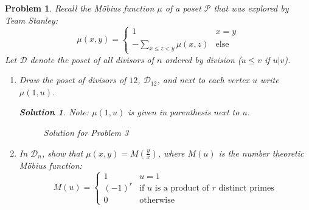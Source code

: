 \documentclass{article}
\theoremstyle{normal}
\newtheorem{problem}{Problem}
\theoremstyle{thmit}
\newtheorem*{solution}{Solution}
\begin{document}
\begin{problem}
    Recall the M\"{o}bius function $\mu$ of a poset $\mathcal{P}$ that was explored by Team Stanley:
    \begin{equation}
        \mu(x,y)=
        \begin{cases}
            1&x=y\\
            -\sum_{x\leq z < y}\mu(x,z)&\text{else}
        \end{cases}
    \end{equation}
    Let $\mathcal{D}$ denote the poset of all divisors of $n$ ordered by division ($u\leq v$ if $u|v$).
    \begin{enumerate}
        \item[(a)]
            Draw the poset of divisors of $12$, $\mathcal{D}_{12}$,
            and next to each vertex $u$ write $\mu(1,u)$.
            \begin{solution}
                Note: $\mu(1,u)$ is given in parenthesis next to $u$.
                \begin{figure}[H]
                    \centering
                    \caption{Solution for Problem 3}
                    \label{fig:SolutionProblem3}
                \end{figure}
            \end{solution}
        \item[(b)]
            In $\mathcal{D}_{n}$, show that $\mu(x,y)=M(\frac{y}{x})$, where $M(u)$ is the
            number theoretic M\"{o}bius function:
            \begin{equation}
                M(u)=
                \begin{cases}
                    1&u=1\\
                    (-1)^r&\text{if $u$ is a product of $r$ distinct primes}\\
                    0&\text{otherwise}
                \end{cases}
            \end{equation}

\end{enumerate}
\end{problem}
\end{document}
